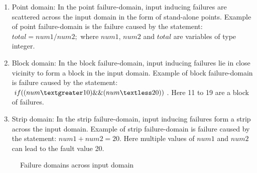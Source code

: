 \begin{enumerate}
\item Point domain: In the point failure-domain, input inducing failures are scattered across the input domain in the form of stand-alone points. Example of point failure-domain is the failure caused by the statement: $total = num1/num2;$ where $num1$, $num2$ and $total$ are variables of type integer.
\item Block domain: In the block failure-domain, input inducing failures lie in close vicinity to form a block in the input domain. Example of block failure-domain is failure caused by the statement: $if ( (num \textgreater 10) \&\& (num \textless 20) )$. Here 11 to 19 are a block of failures.
\item Strip domain: In the strip failure-domain, input inducing failures form a strip across the input domain. Example of strip failure-domain is failure caused by the statement: $num1 + num2 = 20$. Here multiple values of $num1$ and $num2$ can lead to the fault value 20. 
\end{enumerate}
\bigskip
\bigskip

\begin{figure} [H]
\centering
{}
\bigskip

\caption{Failure domains across input domain~\cite{chan1996proportional}}
\label{fig:patterns2}
\end{figure}
\bigskip

